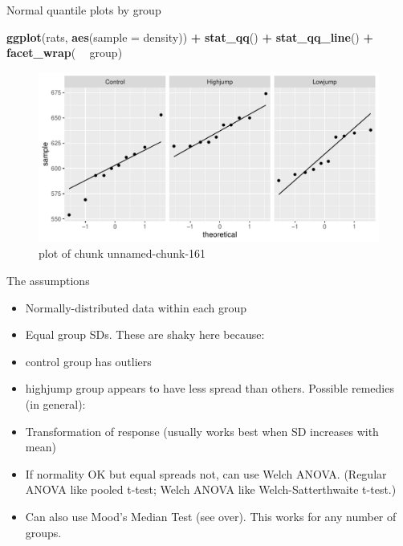 \documentclass[
  ignorenonframetext,
]{beamer}
\newenvironment{Shaded}{\begin{snugshade}}{\end{snugshade}}
\newcommand{\DataTypeTok}[1]{\textcolor[rgb]{0.13,0.29,0.53}{#1}}
\newcommand{\KeywordTok}[1]{\textcolor[rgb]{0.13,0.29,0.53}{\textbf{#1}}}
\newcommand{\NormalTok}[1]{#1}
\newcommand{\OperatorTok}[1]{\textcolor[rgb]{0.81,0.36,0.00}{\textbf{#1}}}
\newcommand{\StringTok}[1]{\textcolor[rgb]{0.31,0.60,0.02}{#1}}
\providecommand{\tightlist}{%
  \setlength{\itemsep}{0pt}\setlength{\parskip}{0pt}}
\begin{document}
\begin{frame}[fragile]{Normal quantile plots by group}
\protect\hypertarget{normal-quantile-plots-by-group}{}

\begin{Shaded}
\begin{Highlighting}[]
\KeywordTok{ggplot}\NormalTok{(rats, }\KeywordTok{aes}\NormalTok{(}\DataTypeTok{sample =}\NormalTok{ density)) }\OperatorTok{+}\StringTok{ }\KeywordTok{stat_qq}\NormalTok{() }\OperatorTok{+}\StringTok{ }
\StringTok{  }\KeywordTok{stat_qq_line}\NormalTok{() }\OperatorTok{+}\StringTok{ }\KeywordTok{facet_wrap}\NormalTok{( }\OperatorTok{~}\StringTok{ }\NormalTok{group)}
\end{Highlighting}
\end{Shaded}

\begin{figure}
\centering
\includegraphics{figure/unnamed-chunk-161-1.pdf}
\caption{plot of chunk unnamed-chunk-161}
\end{figure}

\end{frame}

\begin{frame}{The assumptions}
\protect\hypertarget{the-assumptions}{}

\begin{itemize}
\tightlist
\item
  Normally-distributed data within each group
\item
  Equal group SDs. These are shaky here because:
\item
  control group has outliers
\item
  highjump group appears to have less spread than others. Possible
  remedies (in general):
\item
  Transformation of response (usually works best when SD increases with
  mean)
\item
  If normality OK but equal spreads not, can use Welch ANOVA. (Regular
  ANOVA like pooled t-test; Welch ANOVA like Welch-Satterthwaite
  t-test.)
\item
  Can also use Mood's Median Test (see over). This works for any number
  of groups.
\end{itemize}

\end{frame}
\end{document}
